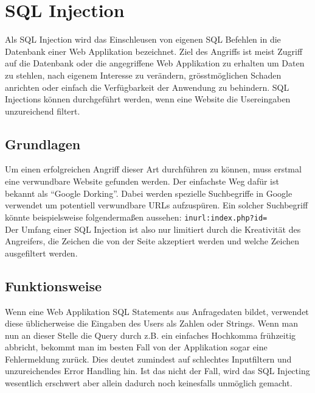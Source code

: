 \section{SQL Injection}
Als SQL Injection wird das Einschleusen von eigenen SQL Befehlen in die Datenbank einer Web Applikation bezeichnet. Ziel des Angriffs ist meist Zugriff auf die Datenbank oder die angegriffene Web Applikation zu erhalten um Daten zu stehlen, nach eigenem Interesse zu ver\"andern, gr\"o{ss}tm\"oglichen Schaden anrichten oder einfach die Verf\"ugbarkeit der Anwendung zu behindern. SQL Injections k\"onnen durchgef\"uhrt werden, wenn eine Website die Usereingaben unzureichend filtert.\cite{hackingWebAppsBuch}

\subsection{Grundlagen}
Um einen erfolgreichen Angriff dieser Art durchf\"uhren zu k\"onnen, muss erstmal eine verwundbare Website gefunden werden. Der einfachste Weg daf\"ur ist bekannt als ``Google Dorking''. Dabei werden spezielle Suchbegriffe in Google verwendet um potentiell verwundbare URLs aufzusp\"uren. Ein solcher Suchbegriff k\"onnte beispielsweise folgenderma{\ss}en aussehen: \texttt{inurl:index.php?id=} \cite{sqlinjectionTutorial}\\
Der Umfang einer SQL Injection ist also nur limitiert durch die Kreativit\"at des Angreifers, die Zeichen die von der Seite akzeptiert werden und welche Zeichen ausgefiltert werden.
\cite{sqlinjectionTutorial}

\subsection{Funktionsweise}
Wenn eine Web Applikation SQL Statements aus Anfragedaten bildet, verwendet diese \"ublicherweise die Eingaben des Users als Zahlen oder Strings. Wenn man nun an dieser Stelle die Query durch z.B. ein einfaches Hochkomma fr\"uhzeitig abbricht, bekommt man im besten Fall von der Applikation sogar eine Fehlermeldung zur\"uck. Dies deutet zumindest auf schlechtes Inputfiltern und unzureichendes Error Handling hin. Ist das nicht der Fall, wird das SQL Injecting wesentlich erschwert aber allein dadurch noch keinesfalls unm\"oglich gemacht.

\clearpage
